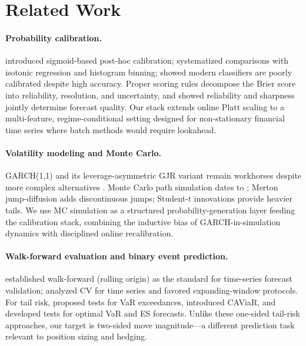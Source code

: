 \documentclass[11pt,a4paper]{article}
\begin{document}
\section{Related Work}
\label{sec:related}

\paragraph{Probability calibration.}
\cite{platt1999probabilistic} introduced sigmoid-based post-hoc calibration; \cite{niculescu2005predicting} systematized comparisons with isotonic regression and histogram binning; \cite{guo2017calibration} showed modern classifiers are poorly calibrated despite high accuracy. Proper scoring rules \cite{gneiting2007strictly} decompose the Brier score into reliability, resolution, and uncertainty, and \cite{brocker2007increasing} showed reliability and sharpness jointly determine forecast quality. Our stack extends online Platt scaling to a multi-feature, regime-conditional setting designed for non-stationary financial time series where batch methods would require lookahead.

\paragraph{Volatility modeling and Monte Carlo.}
GARCH(1,1) \cite{bollerslev1986generalized} and its leverage-asymmetric GJR variant \cite{glosten1993relation} remain workhorses despite more complex alternatives \cite{hansen2005forecast}. Monte Carlo path simulation dates to \cite{boyle1977options}; Merton jump-diffusion \cite{merton1976option} adds discontinuous jumps; Student-$t$ innovations \cite{bollerslev1987conditionally} provide heavier tails. We use MC simulation as a structured probability-generation layer feeding the calibration stack, combining the inductive bias of GARCH-in-simulation dynamics with disciplined online recalibration.

\paragraph{Walk-forward evaluation and binary event prediction.}
\cite{tashman2000out} established walk-forward (rolling origin) as the standard for time-series forecast validation; \cite{bergmeir2012use} analyzed CV for time series and favored expanding-window protocols. For tail risk, \cite{christoffersen1998evaluating} proposed tests for VaR exceedances, \cite{engle2004caviar} introduced CAViaR, and \cite{patton2015good} developed tests for optimal VaR and ES forecasts. Unlike these one-sided tail-risk approaches, our target is two-sided move magnitude---a different prediction task relevant to position sizing and hedging.
\end{document}
